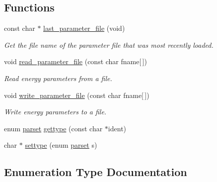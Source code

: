 \subsection*{Functions}
\begin{DoxyCompactItemize}
\item 
const char $\ast$ \mbox{\hyperlink{group__energy__parameters__rw_ga5abafd7bad6d506e18bed13b18123cfe}{last\+\_\+parameter\+\_\+file}} (void)
\begin{DoxyCompactList}\small\item\em Get the file name of the parameter file that was most recently loaded. \end{DoxyCompactList}\item 
void \mbox{\hyperlink{group__energy__parameters__rw_ga165a142a3c68fb6655c69ef4ab7cd749}{read\+\_\+parameter\+\_\+file}} (const char fname\mbox{[}$\,$\mbox{]})
\begin{DoxyCompactList}\small\item\em Read energy parameters from a file. \end{DoxyCompactList}\item 
void \mbox{\hyperlink{group__energy__parameters__rw_ga8a43459be386a7489feeab68dc2c6c76}{write\+\_\+parameter\+\_\+file}} (const char fname\mbox{[}$\,$\mbox{]})
\begin{DoxyCompactList}\small\item\em Write energy parameters to a file. \end{DoxyCompactList}\item 
enum \mbox{\hyperlink{group__energy__parameters__rw_ga7bf2bb363bcf5ce50d60255d256e5682}{parset}} \mbox{\hyperlink{group__energy__parameters__rw_gaaab17a97b765b302b16f7b9eb4004801}{gettype}} (const char $\ast$ident)
\item 
char $\ast$ \mbox{\hyperlink{group__energy__parameters__rw_ga0f228d51ba3fcd7dca0c991f37b2ed2a}{settype}} (enum \mbox{\hyperlink{group__energy__parameters__rw_ga7bf2bb363bcf5ce50d60255d256e5682}{parset}} s)
\end{DoxyCompactItemize}


\subsection{Enumeration Type Documentation}
\mbox{\label{group__energy__parameters__rw_ga7bf2bb363bcf5ce50d60255d256e5682}} 
